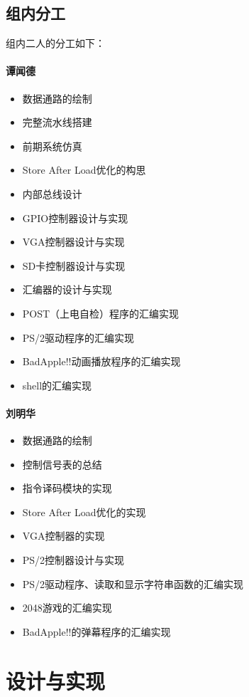 \documentclass[11pt,utf8]{report}
\begin{document}
\section{组内分工}
组内二人的分工如下：
\begin{multicols}{2}
\subsubsection*{谭闻德}
\begin{itemize}
	\item 数据通路的绘制
	\item 完整流水线搭建
	\item 前期系统仿真
	\item Store After Load优化的构思
	\item 内部总线设计
	\item GPIO控制器设计与实现
	\item VGA控制器设计与实现
	\item SD卡控制器设计与实现
	\item 汇编器的设计与实现
	\item POST（上电自检）程序的汇编实现
	\item PS/2驱动程序的汇编实现
	\item BadApple!!动画播放程序的汇编实现
	\item shell的汇编实现
\end{itemize}
\columnbreak
\subsubsection*{刘明华}
\begin{itemize}
	\item 数据通路的绘制
	\item 控制信号表的总结
	\item 指令译码模块的实现
	\item Store After Load优化的实现
	\item VGA控制器的实现
	\item PS/2控制器设计与实现
	\item PS/2驱动程序、读取和显示字符串函数的汇编实现
	\item 2048游戏的汇编实现
	\item BadApple!!的弹幕程序的汇编实现
\end{itemize}
\end{multicols}

\chapter{设计与实现}
\end{document}
